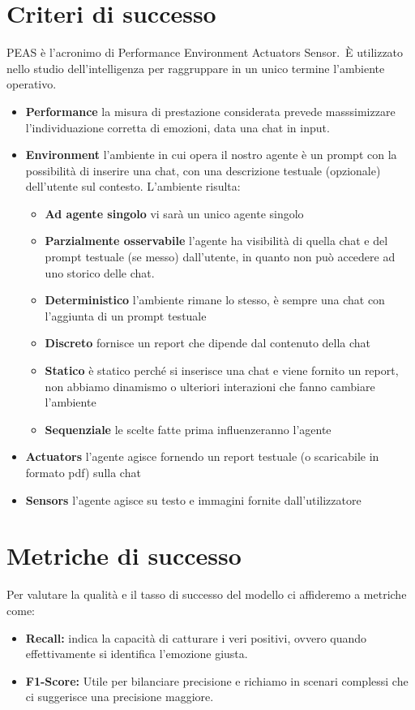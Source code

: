 \documentclass{article}
\begin{document}
\section{Criteri di successo}\label{sec:criteri-di-successo-peas}
PEAS è l'acronimo di Performance Environment Actuators Sensor.\ È utilizzato nello studio dell'intelligenza per raggruppare in un unico termine l'ambiente operativo.
\begin{itemize}
\item \textbf{Performance} la misura di prestazione considerata prevede masssimizzare l'individuazione corretta di emozioni, data una chat in input.
\item \textbf{Environment} l'ambiente in cui opera il nostro agente è un prompt con la possibilità di inserire una chat, con una descrizione testuale (opzionale) dell'utente sul contesto.
L'ambiente risulta:
\begin{itemize}
\item \textbf{Ad agente singolo} vi sarà un unico agente singolo
\item \textbf{Parzialmente osservabile} l'agente ha visibilità di quella chat e del prompt testuale (se messo) dall'utente, in quanto non può accedere ad uno storico delle chat.
\item \textbf{Deterministico} l'ambiente rimane lo stesso, è sempre una chat con l'aggiunta di un prompt testuale
\item \textbf{Discreto} fornisce un report che dipende dal contenuto della chat
\item \textbf{Statico} è statico perché si inserisce una chat e viene fornito un report, non abbiamo dinamismo o ulteriori interazioni che fanno cambiare l'ambiente
\item \textbf{Sequenziale} le scelte fatte prima influenzeranno l'agente
\end{itemize}
\item \textbf{Actuators} l'agente agisce fornendo un report testuale (o scaricabile in formato pdf) sulla chat
\item \textbf{Sensors} l'agente agisce su testo e immagini fornite dall'utilizzatore
\end{itemize}

\section{Metriche di successo}\label{sec:metriche-di-successo}
Per valutare la qualità e il tasso di successo del modello ci affideremo a metriche come:
\begin{itemize}
    \item \textbf{Recall: } indica la capacità di catturare i veri positivi, ovvero quando effettivamente si identifica l'emozione giusta.
    \item \textbf{F1-Score: } Utile per bilanciare precisione e richiamo in scenari complessi che ci suggerisce una precisione maggiore.
\end{itemize}
\end{document}
